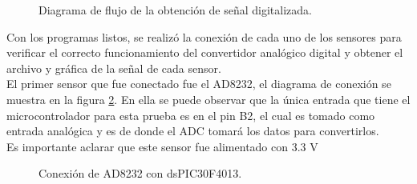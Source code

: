 	\begin{figure}[htbp!]
		\centering
		\caption{Diagrama de flujo de la obtención de señal digitalizada.}
		\label{fig:FlujoSerial}
	\end{figure}
\pagebreak
		
Con los programas listos, se realizó la conexión de cada uno de los sensores para verificar el  correcto funcionamiento del convertidor analógico digital y obtener el archivo y gráfica de la señal de cada sensor.\\

El primer sensor que fue conectado fue el AD8232, el diagrama de conexión se muestra en la figura \ref{fig:ConexionAD8232}. En ella se puede observar que la única entrada que tiene el microcontrolador para esta prueba es en el pin B2, el cual es tomado como entrada analógica y es de donde el ADC tomará los datos para convertirlos.\\

Es importante aclarar que este sensor fue alimentado con 3.3 V

	\begin{figure}[htbp!]
		\centering
		\caption{Conexión de AD8232 con dsPIC30F4013.}
		\label{fig:ConexionAD8232}
	\end{figure}
	
